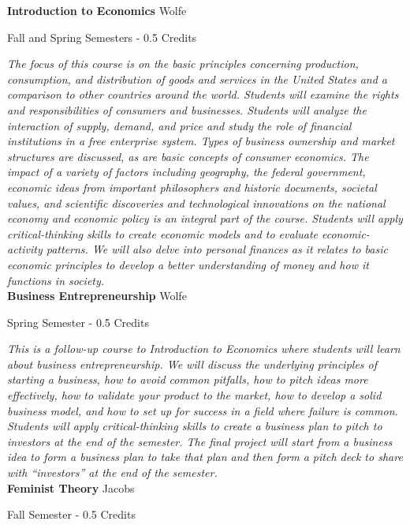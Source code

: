\noindent\textbf{Introduction to Economics} \hfill Wolfe

\noindent Fall and Spring Semesters - 0.5 Credits

\vspace{1mm}\emph{The focus of this course is on the basic principles concerning production, consumption, and distribution of goods and services in the United States and a comparison to other countries around the world. Students will examine the rights and responsibilities of consumers and businesses. Students will analyze the interaction of supply, demand, and price and study the role of financial institutions in a free enterprise system. Types of business ownership and market structures are discussed, as are basic concepts of consumer economics. The impact of a variety of factors including geography, the federal government, economic ideas from important philosophers and historic documents, societal values, and scientific discoveries and technological innovations on the national economy and economic policy is an integral part of the course. Students will apply critical-thinking skills to create economic models and to evaluate economic-activity patterns. We will also delve into personal finances as it relates to basic economic principles to develop a better understanding of money and how it functions in society.}\\

\noindent\textbf{Business Entrepreneurship} \hfill Wolfe

\noindent Spring Semester - 0.5 Credits

\vspace{1mm}\emph{This is a follow-up course to Introduction to Economics where students will learn about business entrepreneurship. We will discuss the underlying principles of starting a business, how to avoid common pitfalls, how to pitch ideas more effectively, how to validate your product to the market, how to develop a solid business model, and how to set up for success in a field where failure is common. Students will apply critical-thinking skills to create a business plan to pitch to investors at the end of the semester. The final project will start from a business idea to form a business plan to take that plan and then form a pitch deck to share with ``investors'' at the end of the semester.}\\

\noindent\textbf{Feminist Theory} \hfill Jacobs

\noindent Fall Semester - 0.5 Credits

